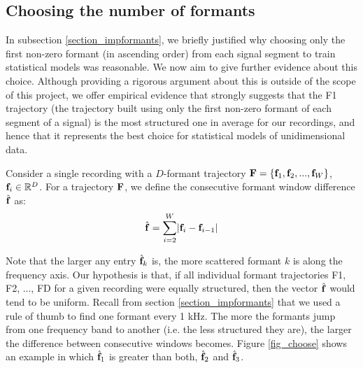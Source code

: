 \documentclass[../main.tex]{subfiles}
\begin{document}
\subsection{Choosing the number of formants} \label{section_choosing}
In subsection \ref{section_impformants}, we briefly justified why choosing only the first non-zero formant (in ascending order) from each signal segment to train statistical models was reasonable. We now aim to give further evidence about this choice. Although providing a rigorous argument about this is outside of the scope of this project, we offer empirical evidence that strongly suggests that the F1 trajectory (the trajectory built using only the first non-zero formant of each segment of a signal) is the most structured one in average for our recordings, and hence that it represents the best choice for statistical models of unidimensional data. 
\par Consider a single recording with a $D$-formant trajectory $\mathbf{F} = \{\mathbf{f}_1, \mathbf{f}_2, ..., \mathbf{f}_W\}$, $\mathbf{f}_i \in \mathbb{R}^D$. For a trajectory $\mathbf{F}$, we define the consecutive formant window difference $\hat{\mathbf{f}}$ as:
\begin{align*} 
\hat{\mathbf{f}} = \sum_{i=2}^W \lvert\mathbf{f}_{i} - \mathbf{f}_{i-1}\rvert
\end{align*}
\par Note that the larger any entry $\hat{\mathbf{f}}_k$ is, the more scattered formant $k$ is along the frequency axis. Our hypothesis is that, if all individual formant trajectories F1, F2, ..., FD for a given recording were equally structured, then the vector $\hat{\mathbf{f}}$ would tend to be uniform. Recall from section \ref{section_impformants} that we used a rule of thumb to find one formant every 1 kHz. The more the formants jump from one frequency band to another (i.e. the less structured they are), the larger the difference between consecutive windows becomes. Figure \ref{fig_choose} shows an example in which $\hat{\mathbf{f}}_1$ is greater than both, $\hat{\mathbf{f}}_2$ and $\hat{\mathbf{f}}_3$.
\end{document}
